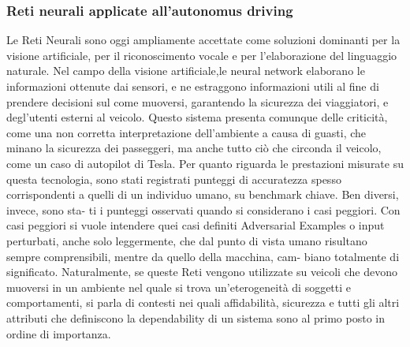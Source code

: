 \documentclass[14pt]{extarticle}
\begin{document}
\subsubsection{Reti neurali applicate all'autonomus driving}
Le Reti Neurali sono oggi ampliamente accettate come soluzioni dominanti per la visione artificiale, per il riconoscimento vocale e per l’elaborazione del linguaggio naturale. Nel campo della visione artificiale,le neural network elaborano le informazioni ottenute dai sensori, e ne estraggono informazioni utili al fine di prendere decisioni sul come muoversi, garantendo la sicurezza dei viaggiatori, e degl'utenti esterni al veicolo. 
Questo sistema presenta comunque delle criticità, come una non corretta interpretazione dell'ambiente a causa di guasti, che minano la sicurezza dei passeggeri, ma anche tutto ciò che circonda il veicolo, come un caso di autopilot di Tesla.
Per quanto riguarda le prestazioni misurate su questa tecnologia, sono stati
registrati punteggi di accuratezza spesso corrispondenti a quelli di un
individuo umano, su benchmark chiave. Ben diversi, invece, sono sta-
ti i punteggi osservati quando si considerano i casi peggiori. Con casi
peggiori si vuole intendere quei casi definiti Adversarial Examples \cite{engstrom2019exploring} o
input perturbati, anche solo leggermente, che dal punto di vista umano
risultano sempre comprensibili, mentre da quello della macchina, cam-
biano totalmente di significato. Naturalmente, se queste Reti vengono
utilizzate su veicoli che devono muoversi in un ambiente nel quale si
trova un’eterogeneità di soggetti e comportamenti, si parla di contesti
nei quali affidabilità, sicurezza e tutti gli altri attributi che definiscono la
dependability di un sistema sono al primo posto in ordine di importanza.
\end{document}
